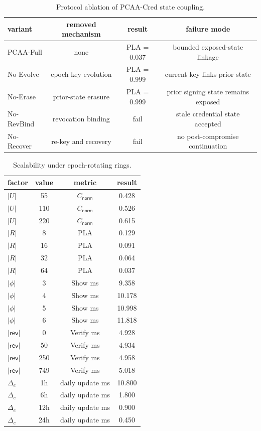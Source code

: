 \begin{table}[htbp]
\centering
\caption{Protocol ablation of PCAA-Cred state coupling.}
\label{tab:ablation}
\begin{tabular}{@{}lccc@{}}
\toprule
variant & removed mechanism & result & failure mode \\
\midrule
PCAA-Full & none & PLA = 0.037 & bounded exposed-state linkage \\
No-Evolve & epoch key evolution & PLA = 0.999 & current key links prior state \\
No-Erase & prior-state erasure & PLA = 0.999 & prior signing state remains exposed \\
No-RevBind & revocation binding & fail & stale credential state accepted \\
No-Recover & re-key and recovery & fail & no post-compromise continuation \\
\bottomrule
\end{tabular}
\end{table}


\begin{table}[htbp]
\centering
\caption{Scalability under epoch-rotating rings.}
\label{tab:scalability}
\begin{tabular}{@{}lccc@{}}
\toprule
factor & value & metric & result \\
\midrule
$|U|$ & 55 & $C_{\mathsf{norm}}$ & 0.428 \\
$|U|$ & 110 & $C_{\mathsf{norm}}$ & 0.526 \\
$|U|$ & 220 & $C_{\mathsf{norm}}$ & 0.615 \\
$|R|$ & 8 & PLA & 0.129 \\
$|R|$ & 16 & PLA & 0.091 \\
$|R|$ & 32 & PLA & 0.064 \\
$|R|$ & 64 & PLA & 0.037 \\
$|\phi|$ & 3 & Show ms & 9.358 \\
$|\phi|$ & 4 & Show ms & 10.178 \\
$|\phi|$ & 5 & Show ms & 10.998 \\
$|\phi|$ & 6 & Show ms & 11.818 \\
$|\mathsf{rev}|$ & 0 & Verify ms & 4.928 \\
$|\mathsf{rev}|$ & 50 & Verify ms & 4.934 \\
$|\mathsf{rev}|$ & 250 & Verify ms & 4.958 \\
$|\mathsf{rev}|$ & 749 & Verify ms & 5.018 \\
$\Delta_e$ & 1h & daily update ms & 10.800 \\
$\Delta_e$ & 6h & daily update ms & 1.800 \\
$\Delta_e$ & 12h & daily update ms & 0.900 \\
$\Delta_e$ & 24h & daily update ms & 0.450 \\
\bottomrule
\end{tabular}
\end{table}
